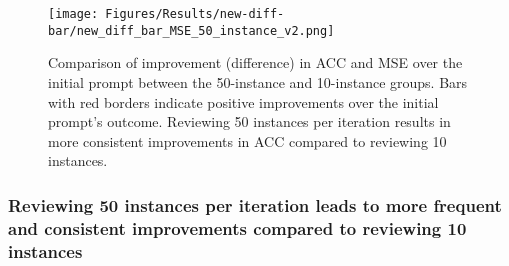 \begin{figure*}[t]
        \centering
        \texttt{[image: Figures/Results/new-diff-bar/new\_diff\_bar\_MSE\_50\_instance\_v2.png]}
  \caption{Comparison of improvement (difference) in ACC and MSE over the initial prompt between the 50-instance and 10-instance groups. Bars with red borders indicate positive improvements over the initial prompt's outcome. Reviewing 50 instances per iteration results in more consistent improvements in ACC compared to reviewing 10 instances. }
  \label{fig:average-50-instance-acc-mse-performance}
\end{figure*}


\subsubsection{Reviewing 50 instances per iteration leads to more frequent and consistent improvements compared to reviewing 10 instances}



